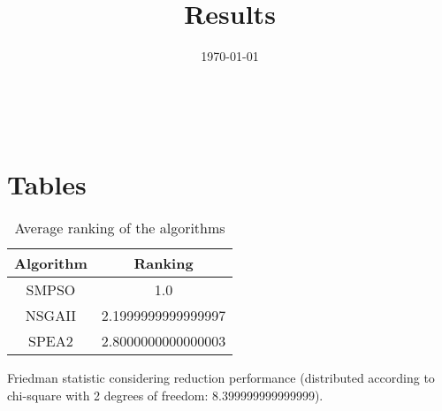 \documentclass{article}
\title{Results}
\author{}
\date{\today}
\begin{document}
\oddsidemargin 0in \topmargin 0in\maketitle
\
\section{Tables}
\begin{table}[!htp]
\centering
\caption{Average ranking of the algorithms}
\begin{tabular}{c|c}
Algorithm&Ranking\\
\hline
SMPSO&1.0\\
NSGAII&2.1999999999999997\\
SPEA2&2.8000000000000003\\
\end{tabular}
\end{table}


Friedman statistic considering reduction performance (distributed according to chi-square with 2 degrees of freedom: 8.399999999999999).
\end{document}

